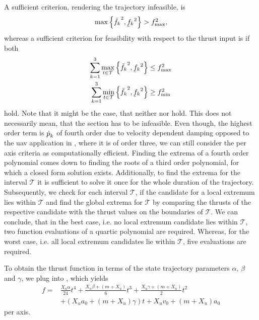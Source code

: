 A sufficient criterion, rendering the trajectory infeasible, is
\begin{equation}
	\label{eq:sufficient-infeasible-thrust}
	\max\left\{\fmaxaxis^2, \fminaxis^2\right\}
	> \fmaxsquare
	,
\end{equation}
whereas a sufficient criterion for feasibility with respect to the thrust input is if both
\begin{align}
	\label{eq:sufficient-feasible-thrust-max}
	\sum_{k=1}^{3}
	\max_{t \in \mathcal{T}}
	\left\{\fmaxaxis^2, \fminaxis^2\right\}
	& \leq
	\fmaxsquare \\
	\label{eq:sufficient-feasible-thrust-min}
	\sum_{k=1}^{3}
	\min_{t \in \mathcal{T}}
	\left\{\fmaxaxis^2, \fminaxis^2\right\}
	& \geq
	\fminsquare
\end{align}
hold. Note that it might be the case, that neither  nor  hold. This does not necessarily mean, that the section has to be infeasible. Even though, the highest order term is $\mbox{$\dot{p}$}_k$ of fourth order due to velocity dependent damping opposed to the \ac{uav} application in \cite{MuellerHehn15}, where it is of order three, we can still consider the per axis criteria as computationally efficient. Finding the extrema of a fourth order polynomial comes down to finding the roots of a third order polynomial, for which a closed form solution exists. Additionally, to find the extrema for the interval $\mathcal{T}$ it is sufficient to solve it once for the whole duration of the trajectory. Subsequently, we check for each interval $\mathcal{T}$, if the candidate for a local extremum lies within $\mathcal{T}$ and find the global extrema for $\mathcal{T}$ by comparing the thrusts of the respective candidate with the thrust values on the boundaries of $\mathcal{T}$. We can conclude, that in the best case, i.e. no local extremum candidate lies within $\mathcal{T}$, two function evaluations of a quartic polynomial are required. Whereas, for the worst case, i.e. all local extremum candidates lie within $\mathcal{T}$, five evaluations are required.

To obtain the thrust function in terms of the state trajectory parameters $\alpha$, $\beta$ and $\gamma$, we plug  into , which yields
\begin{equation}
	\begin{aligned}
		f ={}
		&\frac{X_u \alpha}{24} t^4
		+ \frac{X_u \beta + \left(m+X_{\dot{u}}\right)}{6} t^3
		+ \frac{X_u \gamma + \left(m + X_{\dot{u}}\right)}{2} t^2 \\
		& + \left(
			X_u a_0 + \left(m + X_{\dot{u}}\right) \gamma
		\right) t
		+ X_u v_0
		+ \left(m + X_{\dot{u}}\right) a_0
\end{aligned}
\end{equation}
per axis.

